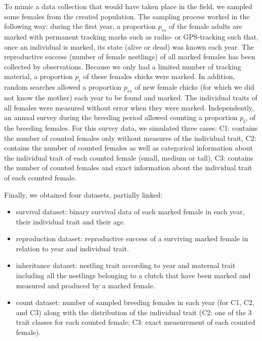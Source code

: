 \documentclass[12pt]{article}
\begin{document}
\vspace{1cm}

To mimic a data collection that would have taken place in the field, we sampled some females from the created population. The sampling process worked in the following way: during the first year, a proportion $p_{rs}$ of the female adults are marked with permanent tracking marks such as radio- or GPS-tracking such that, once an individual is marked, its state (alive or dead) was known each year. The reproductive success (number of female nestlings) of all marked females has been collected by observations. Because we only had a limited number of tracking material, a proportion $p_i$ of these females chicks were marked. In addition, random searches allowed a proportion $p_{rs}$ of new female chicks (for which we did not know the mother) each year to be found and marked. The individual traits of all females were measured without error when they were marked. Independently, an annual survey during the breeding period allowed counting a proportion $p_C$ of the breeding females. For this survey data, we simulated three cases: C1: contains the number of counted females only without measures of the individual trait, C2: contains the number of counted females as well as categorical information about the individual trait of each counted female (small, medium or tall), C3: contains the number of counted females and exact information about the individual trait of each counted female.

Finally, we obtained four datasets, partially linked:
\begin{itemize} 
\item  survival dataset: binary survival data of each marked female in each year, their individual trait and their age.

\item  reproduction dataset: reproductive success of a surviving marked female in relation to year and individual trait.

\item  inheritance dataset: nestling trait according to year and maternal trait including all the nestlings belonging to a clutch that have been marked and measured and produced by a marked female. 

\item  count dataset: number of sampled breeding females in each year (for C1, C2, and C3) along with the distribution of the individual trait (C2: one of the 3 trait classes for each counted female; C3: exact measurement of each counted female).
\end{itemize}  
\end{document}
